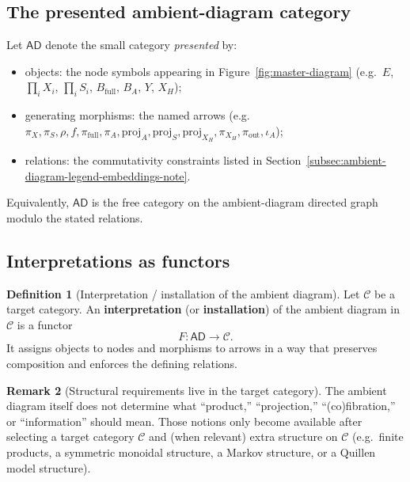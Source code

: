 \documentclass[11pt,a4paper]{article}
\theoremstyle{definition}
\newtheorem{definition}{Definition}[section]
\newtheorem{remark}[definition]{Remark}
\theoremstyle{plain}
\begin{document}
\subsection{The presented ambient-diagram category}
\label{subsec:presented-category}
Let $\mathsf{AD}$ denote the small category \emph{presented} by:
\begin{itemize}
    \item objects: the node symbols appearing in Figure~\ref{fig:master-diagram} (e.g.\ $E$, $\prod_i X_i$, $\prod_i S_i$, $B_{\mathrm{full}}$, $B_A$, $Y$, $X_H$);
    \item generating morphisms: the named arrows (e.g.\ $\pi_X,\pi_S,\rho,f,\pi_{\mathrm{full}},\pi_A,\mathrm{proj}_A,\mathrm{proj}_S,\mathrm{proj}_{X_H},\pi_{X_H},\pi_{\mathrm{out}},\iota_A$);
    \item relations: the commutativity constraints listed in Section~\ref{subsec:ambient-diagram-legend-embeddings-note}.
\end{itemize}
Equivalently, $\mathsf{AD}$ is the free category on the ambient-diagram directed graph modulo the stated relations.

\subsection{Interpretations as functors}
\begin{definition}[Interpretation / installation of the ambient diagram]
\label{def:interpretation}
Let $\mathcal{C}$ be a target category.
An \textbf{interpretation} (or \textbf{installation}) of the ambient diagram in $\mathcal{C}$ is a functor
\[
F:\mathsf{AD}\longrightarrow \mathcal{C}.
\]
It assigns objects to nodes and morphisms to arrows in a way that preserves composition and enforces the defining relations.
\end{definition}

\begin{remark}[Structural requirements live in the target category]
\label{rem:structure-in-target}
The ambient diagram itself does not determine what ``product,'' ``projection,'' ``(co)fibration,'' or ``information'' should mean.
Those notions only become available after selecting a target category $\mathcal{C}$ and (when relevant) extra structure on $\mathcal{C}$ (e.g.\ finite products, a symmetric monoidal structure, a Markov structure, or a Quillen model structure).
\end{remark}
\end{document}
